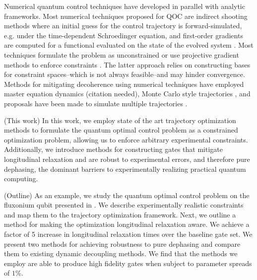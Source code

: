 \documentclass[
  amsfonts,
  amsmath,
  tbtags,
  amssymb,
  aps,
  nobibnotes,
  twocolumn,
  superscriptaddress,
]{revtex4-2}
\begin{document}
Numerical quantum control techniques have developed in parallel
with analytic frameworks.
Most numerical techniques proposed for QOC are indirect shooting
methods where an initial guess for the control trajectory is forward-simulated,
e.g. under the time-dependent Schroedinger equation,
and first-order gradients are computed for a functional evaluated
on the state of the evolved system \cite{leung2017speedup,  goerz2019krotov, doria2011optimal,
  abdelhafez2019gradient, machnes2015gradient, leng2019robust}.
Most techniques formulate the
problem as unconstrained or use
projective gradient methods to enforce constraints
\cite{machnes2015gradient}.
The latter approach relies on constructing
bases for constraint spaces--which is not always feasible--and
may hinder convergence.
Methods for mitigating decoherence using numerical
techniques have employed master equation dynamics (citation needed),
Monte Carlo style trajectories \cite{abdelhafez2019gradient},
and proposals have been made to simulate multiple trajectories
\cite{reinhold2019controlling, rembold2020introduction}.

(This work) In this work, we employ state of the art
trajectory optimization methods
to formulate the quantum
optimal control problem as a constrained optimization problem, allowing
us to enforce arbitrary experimental constraints.
Additionally,
we introduce methods for constructing gates that mitigate longitudinal
relaxation and are robust to experimental errors, and therefore
pure dephasing, the dominant barriers to experimentally
realizing practical quantum computing.

(Outline) As an example, we study the quantum optimal control problem on
the fluxonium qubit presented in \cite{zhang2020universal}.
We describe experimentally realistic constraints and map them to
the trajectory optimization framework. Next, we
outline a method for making the optimization longitudinal
relaxation aware. We achieve a factor of 5 increase in longitudinal relaxation times
over the baseline gate set.
We present two methods for achieving robustness to pure dephasing
and compare them to existing dynamic decoupling methods. We find that
the methods we employ are able to produce high fidelity gates when
subject to parameter spreads of $1\%$.


\end{document}

